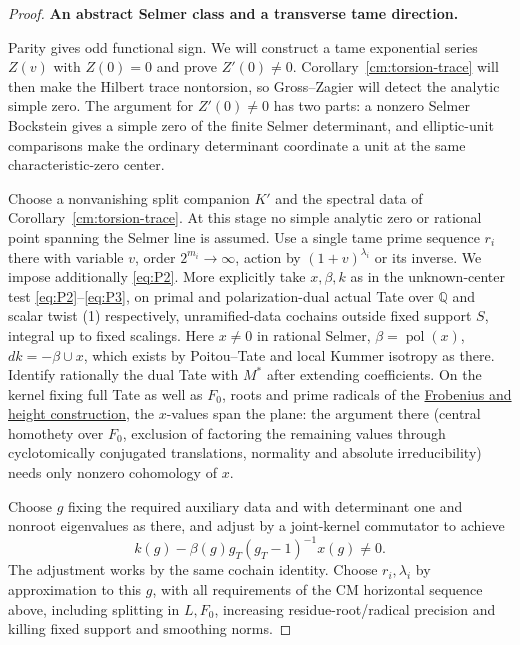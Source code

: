 \begin{proof}
\par\smallskip\noindent\textbf{An abstract Selmer class and a transverse tame direction.}\enspace

Parity gives odd functional sign. We will construct a tame exponential
series \(Z(v)\) with \(Z(0)=0\) and prove \(Z'(0)\ne0\).
Corollary~\ref{cm:torsion-trace} will then make the Hilbert trace
nontorsion, so Gross--Zagier will detect the analytic simple zero.
The argument for \(Z'(0)\ne0\) has two parts: a nonzero Selmer
Bockstein gives a simple zero of the finite Selmer determinant, and
elliptic-unit comparisons make the ordinary determinant coordinate a
unit at the same characteristic-zero center.

Choose a nonvanishing split companion \(K'\) and the spectral
data of Corollary~\ref{cm:torsion-trace}.
At this stage no simple analytic zero or rational point spanning
the Selmer line is assumed. Use a single tame prime sequence \(r_i\) there with variable
\(v\), order \(2^{m_i}\to\infty\), action by \((1+v)^{\lambda_i}\) or its inverse. We impose
additionally \eqref{eq:P2}. More explicitly take \(x,\beta,k\) as in the unknown-center test
\eqref{eq:P2}–\eqref{eq:P3}, on primal and polarization-dual actual Tate over \(\mathbb Q\)
and scalar twist (1) respectively, unramified-data cochains outside fixed support \(S\),
integral up to fixed scalings. Here \(x\ne0\) in rational Selmer,
\(\beta=\operatorname{pol}(x)\), \(dk=-\beta\cup x\), which exists by Poitou--Tate and local
Kummer isotropy as there. Identify rationally the dual Tate with \(M^*\) after extending
coefficients. On the kernel fixing full Tate as well as \(F_0\), roots and prime radicals of
the \hyperref[cm:construction:transversality]{Frobenius and height construction}, the \(x\)-values span the plane: the argument there (central
homothety over \(F_0\), exclusion of factoring the remaining values through cyclotomically
conjugated translations, normality and absolute irreducibility) needs only nonzero cohomology
of \(x\).

Choose \(g\) fixing the required auxiliary data and with determinant one and nonroot
eigenvalues as there, and adjust by a joint-kernel commutator to achieve
\begin{equation}\label{cm:eq:transverse-selmer}
k(g)-\beta(g)g_T(g_T-1)^{-1}x(g)\ne0 .
\end{equation}
The adjustment works by the same cochain identity. Choose \(r_i,\lambda_i\) by approximation
to this \(g\), with all requirements of the CM horizontal sequence above, including splitting
in \(L,F_0\), increasing residue-root/radical precision and killing fixed support and
smoothing norms.


\end{proof}
